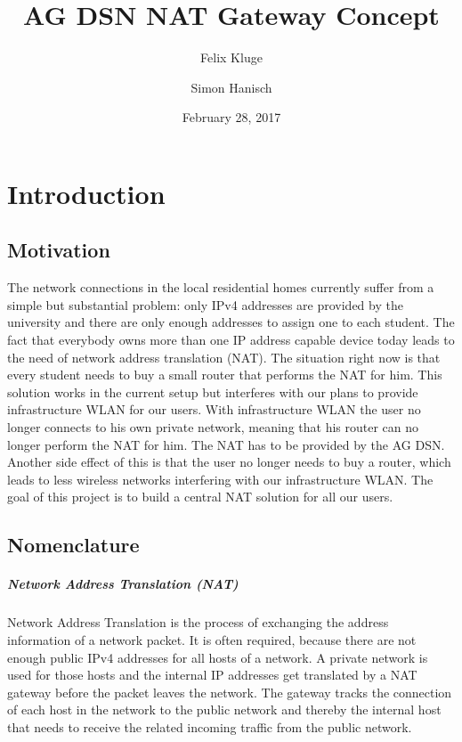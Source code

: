 \documentclass{report}
\title{AG DSN NAT Gateway Concept}
\date{February 28, 2017}
\author{Felix Kluge \and Simon Hanisch}
\begin{document}
\maketitle
\tableofcontents

\chapter{Introduction}\label{introduction}

\section{Motivation}\label{motivation}

The network connections in the local residential homes currently suffer
from a simple but substantial problem: only IPv4 addresses are provided
by the university and there are only enough addresses to assign one to
each student. The fact that everybody owns more than one IP address capable device
today leads to the need of network address translation (NAT). The situation right now is that
every student needs to buy a small router that performs the NAT for him. This solution works
in the current setup but interferes with our plans to provide infrastructure WLAN for our users.
With infrastructure WLAN the user no longer connects to his own private network, meaning that his router can no longer
perform the NAT for him. The NAT has to be provided by the AG DSN. Another side effect
of this is that the user no longer needs to buy a router, which leads to less wireless networks 
interfering with our infrastructure WLAN. The goal of this project is to build a central NAT solution
for all our users.

\section{Nomenclature}\label{nomenclature}

\paragraph{Network Address Translation (NAT)}

Network Address Translation is the process of exchanging the address
information of a network packet. It is often required, because there are
not enough public IPv4 addresses for all hosts of a network. A private
network is used for those hosts and the internal IP addresses get
translated by a NAT gateway before the packet leaves the network. The
gateway tracks the connection of each host in the network to the public
network and thereby the internal host that needs to receive the related
incoming traffic from the public network.
\end{document}
